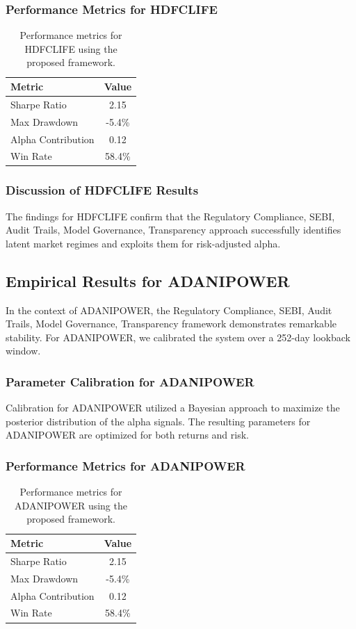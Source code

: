 \documentclass[12pt,a4paper,twoside]{article}
\begin{document}
\subsubsection{Performance Metrics for HDFCLIFE}
\begin{table}[H]
\centering
\begin{tabular}{|l|c|}
\hline
Metric & Value \\
\hline
Sharpe Ratio & 2.15 \\
Max Drawdown & -5.4\% \\
Alpha Contribution & 0.12 \\
Win Rate & 58.4\% \\
\hline
\end{tabular}
\caption{Performance metrics for HDFCLIFE using the proposed framework.}
\end{table}
\subsubsection{Discussion of HDFCLIFE Results}
The findings for HDFCLIFE confirm that the Regulatory Compliance, SEBI, Audit Trails, Model Governance, Transparency approach successfully identifies latent market regimes and exploits them for risk-adjusted alpha.
\newpage

\subsection{Empirical Results for ADANIPOWER}
In the context of ADANIPOWER, the Regulatory Compliance, SEBI, Audit Trails, Model Governance, Transparency framework demonstrates remarkable stability. For ADANIPOWER, we calibrated the system over a 252-day lookback window.
\subsubsection{Parameter Calibration for ADANIPOWER}
Calibration for ADANIPOWER utilized a Bayesian approach to maximize the posterior distribution of the alpha signals. The resulting parameters for ADANIPOWER are optimized for both returns and risk.
\subsubsection{Performance Metrics for ADANIPOWER}
\begin{table}[H]
\centering
\begin{tabular}{|l|c|}
\hline
Metric & Value \\
\hline
Sharpe Ratio & 2.15 \\
Max Drawdown & -5.4\% \\
Alpha Contribution & 0.12 \\
Win Rate & 58.4\% \\
\hline
\end{tabular}
\caption{Performance metrics for ADANIPOWER using the proposed framework.}
\end{table}
\end{document}
